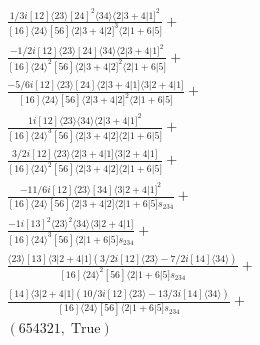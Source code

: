 \documentclass[varwidth, border=5pt]{standalone}
\begin{document}
\begin{my}
$\begin{gathered}
\scriptscriptstyle\frac{1/3i[12]⟨23⟩[24]^2⟨34⟩⟨2|3+4|1]^2}{[16]⟨24⟩[56]⟨2|3+4|2]^3⟨2|1+6|5]}+\\
\scriptscriptstyle\frac{-1/2i[12]⟨23⟩[24]⟨34⟩⟨2|3+4|1]^2}{[16]⟨24⟩^2[56]⟨2|3+4|2]^2⟨2|1+6|5]}+\\
\scriptscriptstyle\frac{-5/6i[12]⟨23⟩[24]⟨2|3+4|1]⟨3|2+4|1]}{[16]⟨24⟩[56]⟨2|3+4|2]^2⟨2|1+6|5]}+\\
\scriptscriptstyle\frac{1i[12]⟨23⟩⟨34⟩⟨2|3+4|1]^2}{[16]⟨24⟩^3[56]⟨2|3+4|2]⟨2|1+6|5]}+\\
\scriptscriptstyle\frac{3/2i[12]⟨23⟩⟨2|3+4|1]⟨3|2+4|1]}{[16]⟨24⟩^2[56]⟨2|3+4|2]⟨2|1+6|5]}+\\
\scriptscriptstyle\frac{-11/6i[12]⟨23⟩[34]⟨3|2+4|1]^2}{[16]⟨24⟩[56]⟨2|3+4|2]⟨2|1+6|5]s_{234}}+\\
\scriptscriptstyle\frac{-1i[13]^2⟨23⟩^2⟨34⟩⟨3|2+4|1]}{[16]⟨24⟩^3[56]⟨2|1+6|5]s_{234}}+\\
\scriptscriptstyle\frac{⟨23⟩[13]⟨3|2+4|1](3/2i[12]⟨23⟩-7/2i[14]⟨34⟩)}{[16]⟨24⟩^2[56]⟨2|1+6|5]s_{234}}+\\
\scriptscriptstyle\frac{[14]⟨3|2+4|1](10/3i[12]⟨23⟩-13/3i[14]⟨34⟩)}{[16]⟨24⟩[56]⟨2|1+6|5]s_{234}}+\\
\scriptscriptstyle(654321,\;\text{True})\phantom{+}
\end{gathered}$
\end{my}
\end{document}
